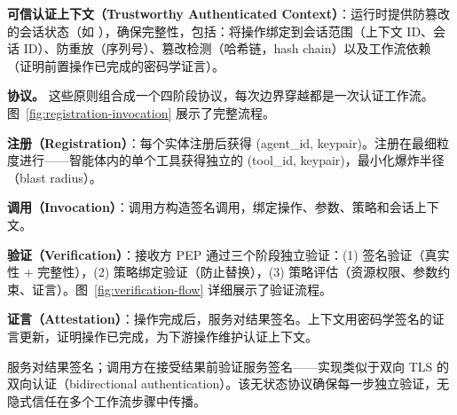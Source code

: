 \textbf{可信认证上下文（Trustworthy Authenticated Context）}：运行时提供防篡改的会话状态（如 \cite{rajagopalan2025prompts}），确保完整性，包括：将操作绑定到会话范围（上下文 ID、会话 ID）、防重放（序列号）、篡改检测（哈希链，hash chain）以及工作流依赖（证明前置操作已完成的密码学证言）。



\noindent\textbf{协议。}
这些原则组合成一个四阶段协议，每次边界穿越都是一次认证工作流。图~\ref{fig:registration-invocation} 展示了完整流程。

\textbf{注册（Registration）}：每个实体注册后获得 (agent\_id, keypair)。注册在最细粒度进行——智能体内的单个工具获得独立的 (tool\_id, keypair)，最小化爆炸半径（blast radius）。

\textbf{调用（Invocation）}：调用方构造签名调用，绑定操作、参数、策略和会话上下文。

\textbf{验证（Verification）}：接收方 PEP 通过三个阶段独立验证：(1) 签名验证（真实性 + 完整性），(2) 策略绑定验证（防止替换），(3) 策略评估（资源权限、参数约束、证言）。图~\ref{fig:verification-flow} 详细展示了验证流程。

\textbf{证言（Attestation）}：操作完成后，服务对结果签名。上下文用密码学签名的证言更新，证明操作已完成，为下游操作维护认证上下文。


服务对结果签名；调用方在接受结果前验证服务签名——实现类似于双向 TLS 的双向认证（bidirectional authentication）。该无状态协议确保每一步独立验证，无隐式信任在多个工作流步骤中传播。



